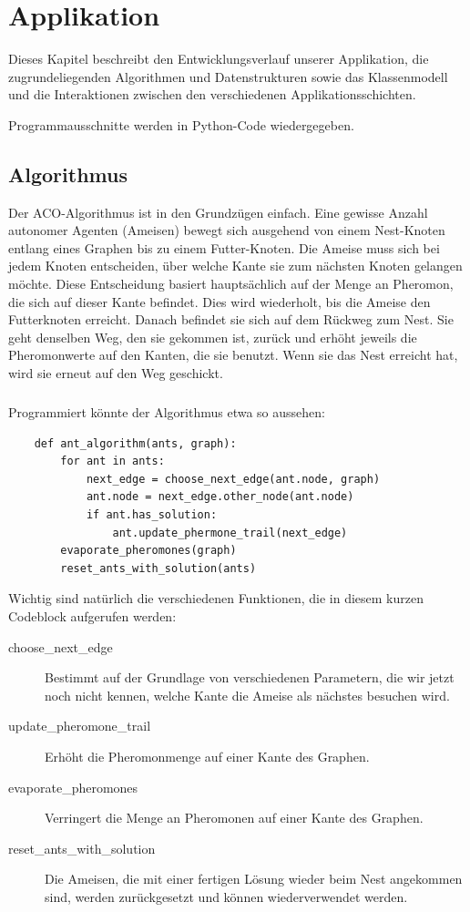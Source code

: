 

\chapter{Applikation}

Dieses Kapitel beschreibt den Entwicklungsverlauf unserer Applikation, die zugrundeliegenden Algorithmen und Datenstrukturen sowie das Klassenmodell und die Interaktionen zwischen den verschiedenen Applikationsschichten.

Programmausschnitte werden  in Python-Code wiedergegeben.

\section{Algorithmus}

Der ACO-Algorithmus ist in den Grundzügen einfach. Eine gewisse Anzahl autonomer Agenten (Ameisen) bewegt sich ausgehend von einem Nest-Knoten entlang eines Graphen bis zu einem Futter-Knoten. Die Ameise muss sich bei jedem Knoten entscheiden, über welche Kante sie zum nächsten Knoten gelangen möchte. Diese Entscheidung basiert hauptsächlich auf der Menge an Pheromon, die sich auf dieser Kante befindet. Dies wird wiederholt, bis die Ameise den Futterknoten erreicht. Danach befindet sie sich auf dem Rückweg zum Nest. Sie geht denselben Weg, den sie gekommen ist, zurück und erhöht jeweils die Pheromonwerte auf den Kanten, die sie benutzt. Wenn sie das Nest erreicht hat, wird sie erneut auf den Weg geschickt.

\paragraph*{}
\noindent
Programmiert könnte der Algorithmus etwa so aussehen:

\lstset{language=Python}
\begin{lstlisting}
	def ant_algorithm(ants, graph):
		for ant in ants:
			next_edge = choose_next_edge(ant.node, graph)
			ant.node = next_edge.other_node(ant.node)
			if ant.has_solution:
				ant.update_phermone_trail(next_edge)	
		evaporate_pheromones(graph)
		reset_ants_with_solution(ants)
\end{lstlisting}

\noindent
Wichtig sind natürlich die verschiedenen Funktionen, die in diesem kurzen Codeblock aufgerufen werden:

\begin{description}
\item[choose\_next\_edge] Bestimmt auf der Grundlage von verschiedenen Parametern, die wir jetzt noch nicht kennen, welche Kante die Ameise als nächstes besuchen wird.
\item[update\_pheromone\_trail] Erhöht die Pheromonmenge auf einer Kante des Graphen.
\item[evaporate\_pheromones] Verringert die Menge an Pheromonen auf einer Kante des Graphen.
\item[reset\_ants\_with\_solution] Die Ameisen, die mit einer fertigen Lösung wieder beim Nest angekommen sind, werden zurückgesetzt und können wiederverwendet werden. 
\end{description}

